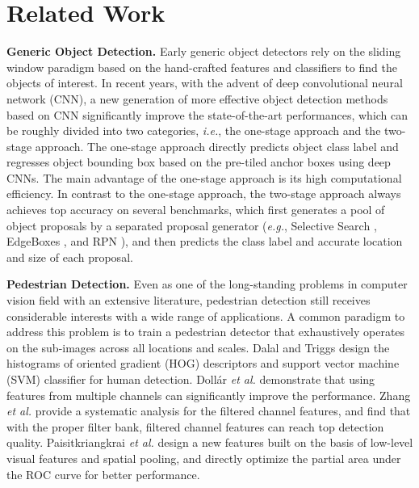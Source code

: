 \documentclass[runningheads]{llncs}
\def\ie{{\em i.e.}}
\def\eg{{\em e.g.}}
\def\etal{{\em et al. }}
\begin{document}
\section{Related Work}

{\flushleft \textbf{Generic Object Detection.}}
Early generic object detectors \cite{DBLP:journals/ijcv/ViolaJ04,DBLP:journals/pami/FelzenszwalbGMR10,DBLP:journals/pami/DollarABP14,DBLP:journals/ijcv/PapageorgiouP00} rely on the sliding window paradigm based on the hand-crafted features and classifiers to find the objects of interest. In recent years, with the advent of deep convolutional neural network (CNN), a new generation of more effective object detection methods based on CNN significantly improve the state-of-the-art performances, which can be roughly divided into two categories, \ie, the one-stage approach and the two-stage approach. The one-stage approach \cite{DBLP:conf/eccv/LiuAESRFB16,DBLP:journals/corr/RedmonF16} directly predicts object class label and regresses object bounding box based on the pre-tiled anchor boxes using deep CNNs. The main advantage of the one-stage approach is its high computational efficiency. In contrast to the one-stage approach, the two-stage approach \cite{DBLP:journals/pami/RenHG017,DBLP:conf/nips/DaiLHS16,DBLP:conf/cvpr/LinDGHHB17} always achieves top accuracy on several benchmarks, which first generates a pool of object proposals by a separated proposal generator (\eg, Selective Search \cite{DBLP:journals/ijcv/UijlingsSGS13}, EdgeBoxes \cite{DBLP:conf/eccv/ZitnickD14}, and RPN \cite{DBLP:journals/pami/RenHG017}), and then predicts the class label and accurate location and size of each proposal.


{\flushleft \textbf{Pedestrian Detection.}}
Even as one of the long-standing problems in computer vision field with an extensive literature, pedestrian detection still receives considerable interests with a wide range of applications. A common paradigm \cite{DBLP:conf/bmvc/DollarTPB09,DBLP:conf/cvpr/YanLYL12,DBLP:conf/cvpr/BenensonMTG13,DBLP:conf/cvpr/YanZLLL13,DBLP:conf/cvpr/ZhangBC14} to address this problem is to train a pedestrian detector that exhaustively operates on the sub-images across all locations and scales. Dalal and Triggs \cite{DBLP:conf/cvpr/DalalT05} design the histograms of oriented gradient (HOG) descriptors and support vector machine (SVM) classifier for human detection. Doll{\'{a}}r \etal \cite{DBLP:journals/pami/DollarABP14} demonstrate that using features from multiple channels can significantly improve the performance. Zhang \etal \cite{DBLP:conf/cvpr/ZhangBS15} provide a systematic analysis for the filtered channel features, and find that with the proper filter bank, filtered channel features can reach top detection quality. Paisitkriangkrai \etal \cite{DBLP:conf/eccv/PaisitkriangkraiSH14} design a new features built on the basis of low-level visual features and spatial pooling, and directly optimize the partial area under the ROC curve for better performance.
\end{document}
